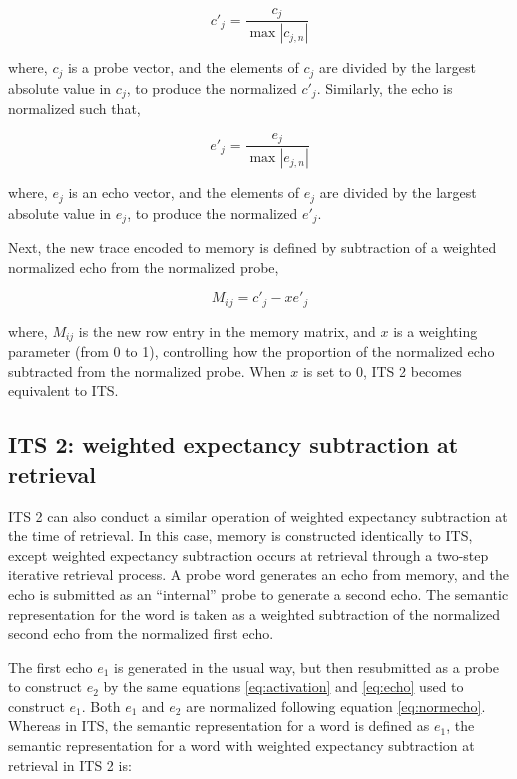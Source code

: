 \documentclass[10pt,letterpaper]{article}
\begin{document}
\begin{equation}
c'_j = \frac{c_j}{\max | c_{j,n} |}
\label{eq:normprobe}
\end{equation}

where, \(c_j\) is a probe vector, and the elements of \(c_j\) are divided by the largest absolute value in \(c_j\), to produce the normalized \(c'_j\). Similarly, the echo is normalized such that,

\begin{equation}
e'_j = \frac{e_j}{\max | e_{j,n} |}
\label{eq:normecho}
\end{equation}

where, \(e_j\) is an echo vector, and the elements of \(e_j\) are divided by the largest absolute value in \(e_j\), to produce the normalized \(e'_j\).

Next, the new trace encoded to memory is defined by subtraction of a weighted normalized echo from the normalized probe,

\begin{equation}
M_{ij} = c'_j  - xe'_j
\label{eq:ITS2encoding}
\end{equation}

where, \(M_{ij}\) is the new row entry in the memory matrix, and \(x\) is a weighting parameter (from 0 to 1), controlling how the proportion of the normalized echo subtracted from the normalized probe. When \(x\) is set to 0, ITS 2 becomes equivalent to ITS.

\subsection{ITS 2: weighted expectancy subtraction at retrieval}

ITS 2 can also conduct a similar operation of weighted expectancy subtraction at the time of retrieval. In this case, memory is constructed identically to ITS, except weighted expectancy subtraction occurs at retrieval through a two-step iterative retrieval process. A probe word generates an echo from memory, and the echo is submitted as an ``internal'' probe to generate a second echo. The semantic representation for the word is taken as a weighted subtraction of the normalized second echo from the normalized first echo.

The first echo \(e_1\) is generated in the usual way, but then resubmitted as a probe to construct \(e_2\) by the same equations \ref{eq:activation} and \ref{eq:echo} used to construct \(e_1\). Both \(e_1\) and \(e_2\) are normalized following equation \ref{eq:normecho}. Whereas in ITS, the semantic representation for a word is defined as \(e_1\), the semantic representation for a word with weighted expectancy subtraction at retrieval in ITS 2 is:
\end{document}
